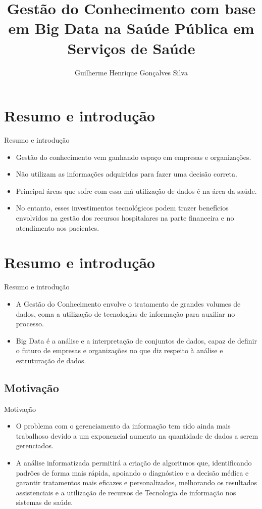 \documentclass{beamer}
\title{Gestão do Conhecimento com base em Big Data na Saúde Pública em Serviços de Saúde}
\author{Guilherme Henrique Gonçalves Silva}
\institute[] %
{
  DEPARTAMENTO DE COMPUTAÇÃO\\
  Universidade Estadual de Londrina
}
\begin{document}
\begin{frame}
  \titlepage
\end{frame}

\section{Resumo e introdução}
\begin{frame}{Resumo e introdução}
  \begin{itemize}
  \item {Gestão do conhecimento vem ganhando espaço em empresas e organizações.
    }
    \item{Não utilizam as informações adquiridas para fazer uma decisão correta.}
    \item{Principal áreas que sofre com essa má utilização de dados é na área da saúde.
  }
  \item {No entanto, esses investimentos tecnológicos podem trazer benefícios  envolvidos na gestão dos recursos hospitalares na parte financeira e no atendimento aos pacientes.
  }
  \end{itemize}
\end{frame}

\section{Resumo e introdução}
\begin{frame}{Resumo e introdução}
    \begin{itemize}
        \item {A Gestão do Conhecimento envolve o tratamento de grandes volumes de dados, coma a utilização de tecnologias de informação para auxiliar no processo.
        }
        \item{Big Data é a análise e a interpretação de conjuntos de dados, capaz de definir o futuro de empresas e organizações no que diz respeito à análise e estruturação de dados.
        }
    \end{itemize}
\end{frame}


\subsection{Motivação}
\begin{frame}{Motivação}
    \begin{itemize}
        \item {O problema com o gerenciamento da informação tem sido ainda mais trabalhoso devido a um exponencial aumento na quantidade de dados a serem gerenciados.}
        \item{A análise informatizada permitirá a criação de algoritmos que, identificando padrões de forma mais rápida, apoiando o diagnóstico e a decisão médica e garantir tratamentos mais eficazes e personalizados, melhorando os resultados assistenciais e a utilização de recursos de Tecnologia de informação nos sistemas de saúde.}
    \end{itemize}
\end{frame}
\end{document}

